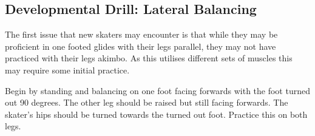 \subsection*{Developmental Drill: Lateral Balancing}
\label{drill:laterals:developmental_balancing}

The first issue that new skaters may encounter is that while they may be proficient in one footed glides with their legs parallel, they may not have practiced with their legs akimbo.     
As this utilises different sets of muscles this may require some initial practice.


Begin by standing and balancing on one foot facing forwards with the foot turned out 90 degrees.
The other leg should be raised but still facing forwards. 
The skater's hips should be turned towards the turned out foot. 
Practice this on both legs.

